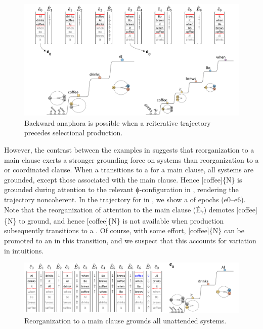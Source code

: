 \ea\label{ex:7:1}
\z
\z
  
\begin{figure}
\includegraphics[width=\textwidth]{figures/Tilsen-img154.png}
\caption{Backward anaphora is possible when a reiterative trajectory precedes selectional production.}
\label{fig:7:10}
\end{figure}
 

  However, the  contrast between the examples in  suggests that reorganization to a main clause exerts a stronger grounding force on systems than reorganization to a  or coordinated clause. When a  transitions to a  for a main clause, all systems are grounded, except those associated with the main clause. Hence [coffee]\{N\} is grounded during attention to the relevant ϕ-con\-fig\-u\-ra\-tion in , rendering the trajectory noncoherent. In the trajectory for  in {}, we show a  of epochs (e0--e6). Note that the reorganization of attention to the main clause (Ê\textsubscript{7}) demotes [coffee]\{N\} to ground, and hence [coffee]\{N\} is not available when production subsequently transitions to a . Of course, with some effort, [coffee]\{N\} can be promoted to an  in this transition, and we suspect that this accounts for variation in  intuitions. 

\ea\label{ex:7:2}
\z
\z
  
\begin{figure}
\includegraphics[width=\textwidth]{figures/Tilsen-img155.png}
\caption{Reorganization to a main clause grounds all unattended systems.}
\label{fig:7:11}
\end{figure}
 

